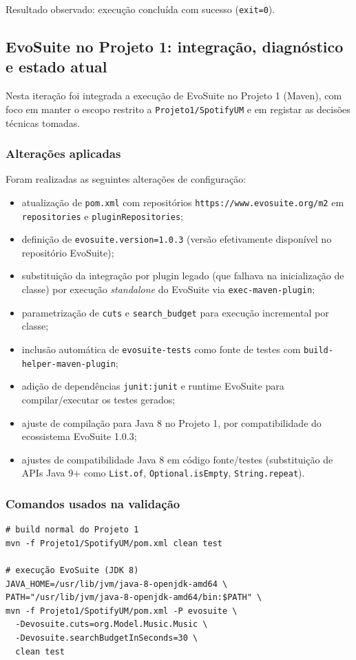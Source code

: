 \documentclass{article}
\begin{document}
Resultado observado: execução concluída com sucesso (\texttt{exit=0}).

\subsection{EvoSuite no Projeto 1: integração, diagnóstico e estado atual}
Nesta iteração foi integrada a execução de EvoSuite no Projeto 1 (Maven), com foco em manter o escopo restrito a \texttt{Projeto1/SpotifyUM} e em registar as decisões técnicas tomadas.

\subsubsection{Alterações aplicadas}
Foram realizadas as seguintes alterações de configuração:
\begin{itemize}
    \item atualização de \texttt{pom.xml} com repositórios \texttt{https://www.evosuite.org/m2} em \texttt{repositories} e \texttt{pluginRepositories};
    \item definição de \texttt{evosuite.version=1.0.3} (versão efetivamente disponível no repositório EvoSuite);
    \item substituição da integração por plugin legado (que falhava na inicialização de classe) por execução \textit{standalone} do EvoSuite via \texttt{exec-maven-plugin};
    \item parametrização de \texttt{cuts} e \texttt{search\_budget} para execução incremental por classe;
    \item inclusão automática de \texttt{evosuite-tests} como fonte de testes com \texttt{build-helper-maven-plugin};
    \item adição de dependências \texttt{junit:junit} e runtime EvoSuite para compilar/executar os testes gerados;
    \item ajuste de compilação para Java 8 no Projeto 1, por compatibilidade do ecossistema EvoSuite 1.0.3;
    \item ajustes de compatibilidade Java 8 em código fonte/testes (substituição de APIs Java 9+ como \texttt{List.of}, \texttt{Optional.isEmpty}, \texttt{String.repeat}).
\end{itemize}

\subsubsection{Comandos usados na validação}
\begin{lstlisting}[caption={Validação de build normal e execução EvoSuite no Projeto 1},label={lst:proj1-evosuite-commands}]
# build normal do Projeto 1
mvn -f Projeto1/SpotifyUM/pom.xml clean test

# execução EvoSuite (JDK 8)
JAVA_HOME=/usr/lib/jvm/java-8-openjdk-amd64 \
PATH="/usr/lib/jvm/java-8-openjdk-amd64/bin:$PATH" \
mvn -f Projeto1/SpotifyUM/pom.xml -P evosuite \
  -Devosuite.cuts=org.Model.Music.Music \
  -Devosuite.searchBudgetInSeconds=30 \
  clean test
\end{lstlisting}
\end{document}
